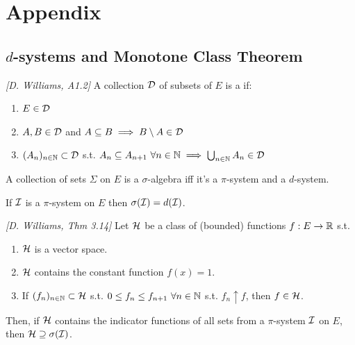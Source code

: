 \section{Appendix}

\subsection{$d$-systems and Monotone Class Theorem}

\begin{definition}[$d$-system] \hfill \textit{[D. Williams, A1.2]}
    A collection $\mathcal{D}$ of subsets of $E$ is a  if:
    \begin{enumerate}[label=(\roman*)]
        \item $E \in \mathcal{D}$
        \item $A, B \in \mathcal{D}$ and $A \subseteq B \implies B \setminus A \in \mathcal{D}$
        \item $(A_n)_{n \in \mathbb N} \subset \mathcal{D}$ s.t. $A_n \subseteq A_{n+1} \ \forall n \in \NN \implies \bigcup_{n \in \NN} A_n \in \mc{D}$
    \end{enumerate}
\end{definition}

\begin{proposition}
    A collection of sets $\Sigma$ on $E$ is a $\sigma$-algebra iff it's a $\pi$-system and a $d$-system.
\end{proposition}

\begin{lemma}
    If $\mathcal{I}$ is a $\pi$-system on $E$ then $\sigma(\mathcal{I}) = d(\mathcal{I})$.
\end{lemma}

\begin{theorem} \hfill \textit{[D. Williams, Thm 3.14]}
    Let $\mathcal{H}$ be a class of (bounded) functions $f: E \to \mathbb R$ s.t.
    \begin{enumerate}[label=(\roman*)]
        \item $\mathcal{H}$ is a vector space.
        \item $\mathcal{H}$ contains the constant function $f(x) = 1$.
        \item If $(f_n)_{n \in \mathbb N} \subset \mathcal{H}$ s.t. $0 \leq f_n \leq f_{n+1} \ \forall n \in \NN$ s.t. $f_n \uparrow f$, then $f \in \mathcal{H}$.
    \end{enumerate}
    Then, if $\mathcal{H}$ contains the indicator functions of all sets from a $\pi$-system $\mathcal{I}$ on $E$, then $\mathcal{H} \supseteq \sigma(\mathcal{I})$.
\end{theorem}

